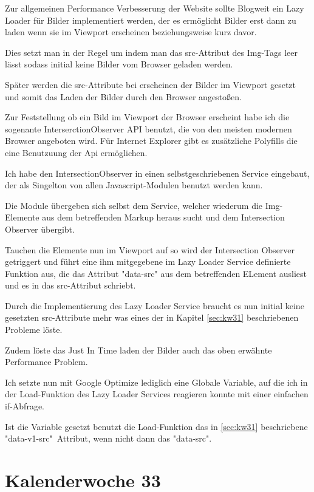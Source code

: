 \documentclass[11pt]{article} %
\begin{document}
Zur allgemeinen Performance Verbesserung der Website sollte Blogweit ein Lazy Loader für Bilder implementiert werden, der es ermöglicht Bilder erst dann zu laden wenn sie im Viewport erscheinen beziehungsweise kurz davor.

Dies setzt man in der Regel um indem man das src-Attribut des Img-Tags leer lässt sodass initial keine Bilder vom Browser geladen werden.

Später werden die src-Attribute bei erscheinen der Bilder im Viewport gesetzt und somit das Laden der Bilder durch den Browser angestoßen.

Zur Feststellung ob ein Bild im Viewport der Browser erscheint habe ich die sogenante InterserctionObserver API benutzt, die von den meisten modernen Browser angeboten wird. Für Internet Explorer gibt es zusätzliche Polyfills die eine Benutzuung der Api ermöglichen.

Ich habe den IntersectionObserver in einen selbstgeschriebenen Service eingebaut, der als Singelton von allen Javascript-Modulen benutzt werden kann.

Die Module übergeben sich selbst dem Service, welcher wiederum die Img-Elemente aus dem betreffenden Markup heraus sucht und dem Intersection Observer übergibt.

Tauchen die Elemente nun im Viewport auf so wird der Intersection Observer getriggert und führt eine ihm mitgegebene im Lazy Loader Service definierte Funktion aus, die das Attribut "data-src" aus dem betreffenden ELement ausliest und es in das src-Attribut schriebt.

Durch die Implementierung des Lazy Loader Service braucht es nun initial keine gesetzten src-Attribute mehr was eines der in Kapitel \ref{sec:kw31} beschriebenen Probleme löste.

Zudem löste das Just In Time laden der Bilder auch das oben erwähnte Performance Problem.

Ich setzte nun mit Google Optimize lediglich eine Globale Variable, auf die ich in der Load-Funktion des Lazy Loader Services reagieren konnte mit einer einfachen if-Abfrage.

Ist die Variable gesetzt benutzt die Load-Funktion das in \ref{sec:kw31} beschriebene "data-v1-src"\ Attribut, wenn nicht dann das "data-src".

\section{Kalenderwoche 33} \label{sec:kw33}
\end{document}
